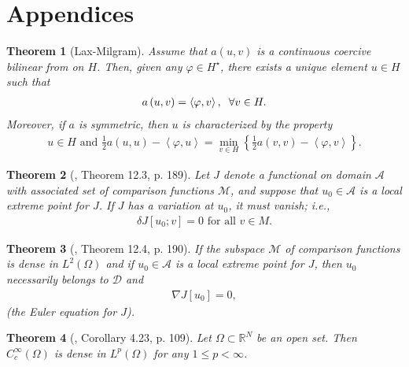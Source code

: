 \documentclass[11pt,a4paper]{article}
\numberwithin{equation}{section}
\numberwithin{equation}{section}
\newtheorem{theorem}{Theorem}[section]
\begin{document}
\section{Appendices}
\begin{theorem}[Lax-Milgram]\label{theorem1.1}
Assume that $a\left(u,v\right)$ is a continuous coercive bilinear from on $H$. Then, given any $\varphi \in H^\star$, there exists a unique element $u\in H$ such that
\begin{align}
a\left( {u,v} \right) = \left\langle {\varphi ,v} \right\rangle ,\hspace{0.2cm} \forall v \in H.
\end{align}
Moreover, if $a$ is symmetric, then $u$ is characterized by the property
\begin{align}
u \in H\mbox{ and } \frac{1}{2}a\left( {u,u} \right) - \left\langle {\varphi ,u} \right\rangle  = \mathop {\min }\limits_{v \in H} \left\{ {\frac{1}{2}a\left( {v,v} \right) - \left\langle {\varphi ,v} \right\rangle } \right\}.
\end{align}
\end{theorem}

\begin{theorem}[\cite{Schaum}, Theorem 12.3, p. 189]\label{theorem12.3}
Let $J$ denote a functional on domain $\mathcal{A}$ with associated set of comparison functions $\mathcal{M}$, and suppose that $u_0\in \mathcal{A}$ is a local extreme point for $J$. If $J$ has a variation at $u_0$, it must vanish; i.e.,
\begin{align}
\delta J\left[ {{u_0};v} \right] = 0 \mbox{ for all } v \in M.
\end{align}
\end{theorem}

\begin{theorem}[\cite{Schaum}, Theorem 12.4, p. 190]
If the subspace $\mathcal{M}$ of comparison functions is dense in $L^2\left(\Omega\right)$ and if $u_0\in \mathcal{A}$ is a local extreme point for $J$, then $u_0$ necessarily belongs to $\mathcal{D}$ and 
\begin{align}
\nabla J\left[ {{u_0}} \right] = 0,
\end{align}
(the Euler equation for $J$).
\end{theorem}

\begin{theorem}[\cite{Haim}, Corollary 4.23, p. 109]
Let $\Omega \subset \mathbb{R}^N$ be an open set. Then $C_c^\infty \left(\Omega\right)$ is dense in $L^p\left(\Omega\right)$ for any $1\le p<\infty$.
\end{theorem}
\end{document}
